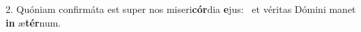 2. Quóniam confirmáta est super nos miseri\textbf{cór}dia \textbf{e}jus: \ast\  et véritas Dómini manet \textbf{in} æ\textbf{tér}num.\

